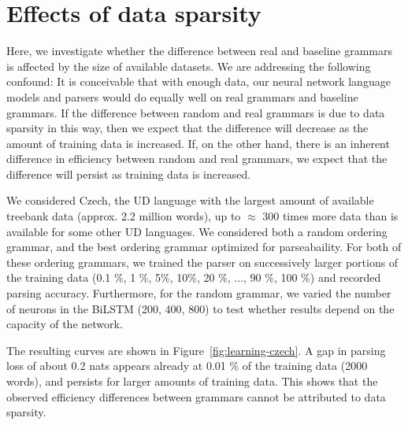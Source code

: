 \documentclass[10pt,twoside,lineno]{article}
\begin{document}
\section{Effects of data sparsity}

Here, we investigate whether the difference between real and baseline grammars is affected by the size of available datasets.
We are addressing the following confound: It is conceivable that with enough data, our neural network language models and parsers would do equally well on real grammars and baseline grammars.
If the difference between random and real grammars is due to data sparsity in this way, then we expect that the difference will decrease as the amount of training data is increased.
If, on the other hand, there is an inherent difference in efficiency between random and real grammars, we expect that the difference will persist as training data is increased.

We considered Czech, the UD language with the largest amount of available treebank data (approx. 2.2 million words), up to $\approx$ 300 times more data than is available for some other UD languages.
We considered both a random ordering grammar, and the best ordering grammar optimized for parseabaility.
For both of these ordering grammars, we trained the parser on successively larger portions of the training data (0.1 \%, 1 \%, 5\%, 10\%, 20 \%, ..., 90 \%, 100 \%) and recorded parsing accuracy.
Furthermore, for the random grammar, we varied the number of neurons in the BiLSTM (200, 400, 800) to test whether results depend on the capacity of the network.


The resulting curves are shown in Figure~\ref{fig:learning-czech}.
A gap in parsing loss of about 0.2 nats appears already at 0.01 \% of the training data (2000 words), and persists for larger amounts of training data.
This shows that the observed efficiency differences between grammars cannot be attributed to data sparsity. 
\end{document}

